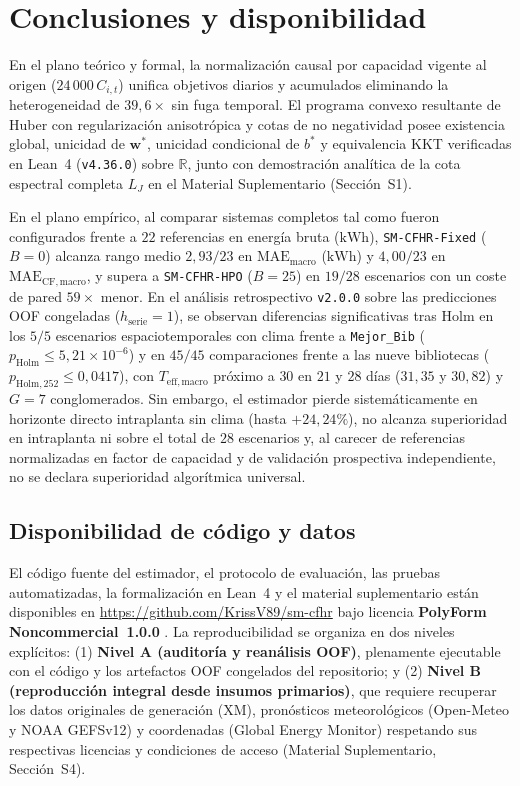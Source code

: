 \section{Conclusiones y disponibilidad}\label{sec:conclusiones}

En el plano teórico y formal, la normalización causal por capacidad vigente al origen ($24\,000\,C_{i,t}$) unifica objetivos diarios y acumulados eliminando la heterogeneidad de $39{,}6\times$ sin fuga temporal. El programa convexo resultante de Huber con regularización anisotrópica y cotas de no negatividad posee existencia global, unicidad de $\mathbf{w}^*$, unicidad condicional de $b^*$ y equivalencia KKT verificadas en Lean~4 (\texttt{v4.36.0}) sobre $\mathbb{R}$, junto con demostración analítica de la cota espectral completa $L_J$ en el Material Suplementario (Sección~S1).

En el plano empírico, al comparar sistemas completos tal como fueron configurados frente a $22$ referencias en energía bruta ($\text{kWh}$), \texttt{SM-CFHR-Fixed} ($B=0$) alcanza rango medio $2{,}93/23$ en $\mathrm{MAE}_{\mathrm{macro}}$ ($\text{kWh}$) y $4{,}00/23$ en $\mathrm{MAE}_{\mathrm{CF,macro}}$, y supera a \texttt{SM-CFHR-HPO} ($B=25$) en $19/28$ escenarios con un coste de pared $59\times$ menor. En el análisis retrospectivo \texttt{v2.0.0} sobre las predicciones OOF congeladas ($h_{\mathrm{serie}}=1$), se observan diferencias significativas tras Holm en los $5/5$ escenarios espaciotemporales con clima frente a \texttt{Mejor\_Bib} ($p_{\mathrm{Holm}} \le 5{,}21\times 10^{-6}$) y en $45/45$ comparaciones frente a las nueve bibliotecas ($p_{\mathrm{Holm,252}} \le 0{,}0417$), con $T_{\mathrm{eff,macro}}$ próximo a $30$ en $21$ y $28$ días ($31{,}35$ y $30{,}82$) y $G=7$ conglomerados. Sin embargo, el estimador pierde sistemáticamente en horizonte directo intraplanta sin clima (hasta $+24{,}24\%$), no alcanza superioridad en intraplanta ni sobre el total de $28$ escenarios y, al carecer de referencias normalizadas en factor de capacidad y de validación prospectiva independiente, no se declara superioridad algorítmica universal.

\subsection*{Disponibilidad de código y datos}

El código fuente del estimador, el protocolo de evaluación, las pruebas automatizadas, la formalización en Lean~4 y el material suplementario están disponibles en \url{https://github.com/KrissV89/sm-cfhr} bajo licencia \textbf{PolyForm Noncommercial~1.0.0} \cite{peng2011reproducible}. La reproducibilidad se organiza en dos niveles explícitos: (1) \textbf{Nivel A (auditoría y reanálisis OOF)}, plenamente ejecutable con el código y los artefactos OOF congelados del repositorio; y (2) \textbf{Nivel B (reproducción integral desde insumos primarios)}, que requiere recuperar los datos originales de generación (XM), pronósticos meteorológicos (Open-Meteo y NOAA GEFSv12) y coordenadas (Global Energy Monitor) respetando sus respectivas licencias y condiciones de acceso (Material Suplementario, Sección~S4).
